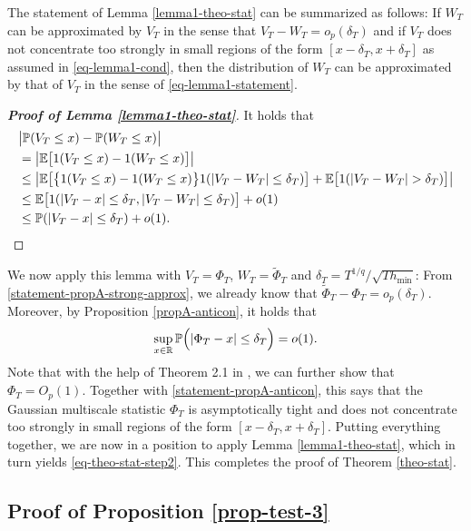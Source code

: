 \documentclass[a4paper,12pt]{article}
\numberwithin{equation}{section}
\begin{document}
The statement of Lemma \ref{lemma1-theo-stat} can be summarized as follows: If $W_T$ can be approximated by $V_T$ in the sense that $V_T - W_T = o_p(\delta_T)$ and if $V_T$ does not concentrate too strongly in small regions of the form $[x - \delta_T,x+\delta_T]$ as assumed in \eqref{eq-lemma1-cond}, then the distribution of $W_T$ can be approximated by that of $V_T$ in the sense of \eqref{eq-lemma1-statement}.
\begin{proof}[\textnormal{\textbf{Proof of Lemma \ref{lemma1-theo-stat}}}] 
It holds that 
\begin{align*}
 & \big| \mathbb{P}(V_T \le x) - \mathbb{P}(W_T \le x) \big| \\
 & = \big| \mathbb{E} \big[ 1(V_T \le x) - 1(W_T \le x) \big] \big| \\
 & \le \big| \mathbb{E} \big[ \big\{ 1(V_T \le x) - 1(W_T \le x) \big\} 1(|V_T - W_T| \le \delta_T) \big] + \mathbb{E} \big[ 1(|V_T - W_T| > \delta_T) \big] \big| \\
 & \le \mathbb{E} \big[ 1(|V_T - x| \le \delta_T, |V_T - W_T| \le \delta_T) \big] + o(1) \\
 & \le \mathbb{P} (|V_T - x| \le \delta_T) + o(1). \qedhere
\end{align*}
\end{proof}
We now apply this lemma with $V_T = \Phi_T$, $W_T = \widetilde{\Phi}_T$ and $\delta_T = T^{1/q} / \sqrt{T h_{\min}}$: From \eqref{statement-propA-strong-approx}, we already know that $\widetilde{\Phi}_T - \Phi_T = o_p(\delta_T)$. Moreover, by Proposition \ref{propA-anticon}, it holds that 
\begin{equation}\label{statement-propA-anticon}
\sup_{x \in \mathbb{R}} \mathbb{P} \Big( | \Phi_T - x | \le \delta_T \Big) = o(1). 
\end{equation}
Note that with the help of Theorem 2.1 in \cite{DuembgenSpokoiny2001}, we can further show that $\Phi_T = O_p(1)$. Together with \eqref{statement-propA-anticon}, this says that the Gaussian multiscale statistic $\Phi_T$ is asymptotically tight and does not concentrate too strongly in small regions of the form $[x - \delta_T,x + \delta_T]$. Putting everything together, we are now in a position to apply Lemma \ref{lemma1-theo-stat}, which in turn yields \eqref{eq-theo-stat-step2}. This completes the proof of Theorem \ref{theo-stat}. 



\subsection*{Proof of Proposition \ref{prop-test-3}}
\end{document}
